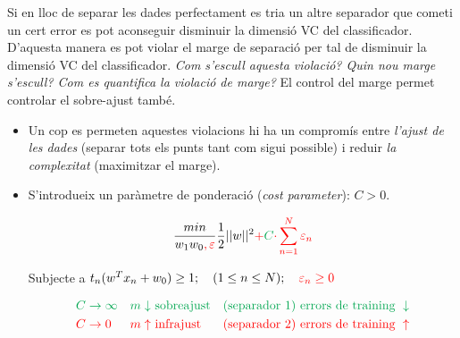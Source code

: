 \documentclass[a4paper]{article}
\begin{document}
\begin{figure}[H]
	\centering
\end{figure}


Si en lloc de separar les dades perfectament es tria un altre separador que cometi un cert error es pot aconseguir disminuir la dimensió VC del classificador. D'aquesta manera es pot violar el marge de separació per tal de disminuir la dimensió VC del classificador. \emph{Com s'escull aquesta violació? Quin nou marge s'escull? Com es quantifica la violació de marge?} El control del marge permet controlar el sobre-ajust també. 

\begin{itemize}
	\item Un cop es permeten aquestes violacions hi ha un compromís entre \emph{l'ajust de les dades} (separar tots els punts tant com sigui possible) i reduir \emph{la complexitat} (maximitzar el marge).
	
	\item S'introdueix un paràmetre de ponderació (\emph{cost parameter}): $C > 0$.
	
	$$
	\frac{min}{w_1 w_0 \textcolor{red}{,\varepsilon}} \frac{1}{2} ||w||^2 \textcolor{red}{+} \textcolor{Green}{C} \textcolor{red}{\cdot \sum_{n=1}^N \varepsilon_n}
	$$
	
	Subjecte a $t_n (w^T x_n + w_0) \ge 1; \quad (1 \le n \le N); \quad \textcolor{red}{\varepsilon_n \ge 0}$
	
	\begin{align*}
		& \textcolor{Green}{C \to \infty} & \textcolor{Green}{m \downarrow} & 
		\textcolor{Green}{\text{ sobreajust}} & \textcolor{Green}{\text{(separador 1)}} &
		\textcolor{Green}{\text{ errors de training } \downarrow} \\
		& \textcolor{red}{C \to 0} & \textcolor{red}{m \uparrow} & 
		\textcolor{red}{\text{ infrajust}} & \textcolor{red}{\text{(separador 2)}} &
		\textcolor{red}{\text{ errors de training } \uparrow}
	\end{align*}
\end{itemize}
\end{document}
